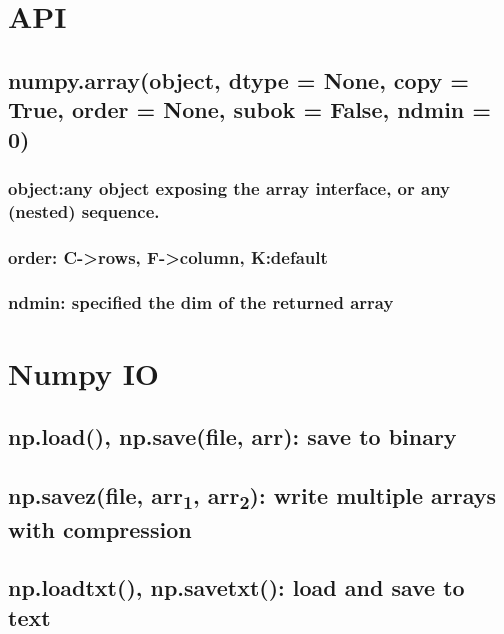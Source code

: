 \documentclass[11pt]{article}
\begin{document}
\section{API}
\label{sec:orgb08a73a}
\subsection{numpy.array(object, dtype = None, copy = True, order = None, subok = False, ndmin = 0)}
\label{sec:org7340c1d}
\subsubsection{object:any object exposing the array interface, or any (nested) sequence.}
\label{sec:org6710188}
\subsubsection{order: C->rows, F->column, K:default}
\label{sec:orge73b1b1}
\subsubsection{ndmin: specified the dim of the returned array}
\label{sec:org6275a7f}







\section{Numpy IO}
\label{sec:org750c5e3}

\subsection{np.load(), np.save(file, arr): save to binary}
\label{sec:org928e0ed}

\subsection{np.savez(file, arr\textsubscript{1}, arr\textsubscript{2}): write multiple arrays with compression}
\label{sec:org3b7b6b1}

\subsection{np.loadtxt(), np.savetxt(): load and save to text}
\label{sec:org0d351bf}
\end{document}
